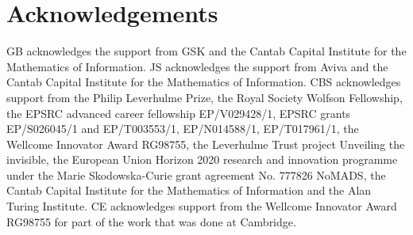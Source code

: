 \section{Acknowledgements} 
GB acknowledges the support from GSK and the Cantab Capital Institute for the Mathematics of Information. 
JS acknowledges the support from Aviva and the Cantab Capital Institute for the Mathematics of Information. 
CBS acknowledges support from the Philip Leverhulme Prize, the Royal Society Wolfson Fellowship, the EPSRC advanced career fellowship EP/V029428/1, EPSRC grants EP/S026045/1 and EP/T003553/1, EP/N014588/1, EP/T017961/1, the Wellcome Innovator Award RG98755, the Leverhulme Trust project Unveiling the invisible, the European Union Horizon 2020 research and innovation programme under the Marie Skodowska-Curie grant agreement No. 777826 NoMADS, the Cantab Capital Institute for the Mathematics of Information and the Alan Turing Institute. CE acknowledges support from
the Wellcome Innovator Award RG98755 for part of the work that was done at Cambridge.
